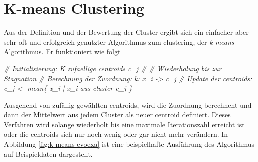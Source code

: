 \documentclass[]{book}
\newenvironment{Shaded}{\begin{snugshade}}{\end{snugshade}}
\newcommand{\CommentTok}[1]{\textcolor[rgb]{0.56,0.35,0.01}{\textit{#1}}}
\theoremstyle{definition}
\theoremstyle{definition}
\theoremstyle{definition}
\theoremstyle{definition}
\theoremstyle{remark}
\begin{document}
\hypertarget{k-means-clustering}{%
\section{K-means Clustering}\label{k-means-clustering}}

Aus der Definition und der Bewertung der Cluster ergibt sich ein einfacher aber sehr oft und erfolgreich genutzter Algorithmus zum clustering, der \emph{k-means} Algorithmus. Er funktioniert wie folgt

\begin{Shaded}
\begin{Highlighting}[numbers=left,,]
\CommentTok{# Initialisierung: K zufaellige centroids c_j}
\CommentTok{#}
\CommentTok{# Wiederholung bis zur Stagnation}
\CommentTok{#   Berechnung der Zuordnung: k: x_i -> c_j}
\CommentTok{#   Update der centroids: c_j <- mean\{ x_i | x_i aus cluster c_j \}}
\end{Highlighting}
\end{Shaded}

Ausgehend von zufällig gewählten centroids, wird die Zuordnung berechnent und dann der Mittelwert aus jedem Cluster als neuer centroid definiert. Dieses Verfahren wird solange wiederholt bis eine maximale Iterationszahl erreicht ist oder die centroids sich nur noch wenig oder gar nicht mehr verändern. In Abbildung \ref{fig:k-means-evoexa} ist eine beispielhafte Ausführung des Algorithmus auf Beispieldaten dargestellt.
\end{document}
